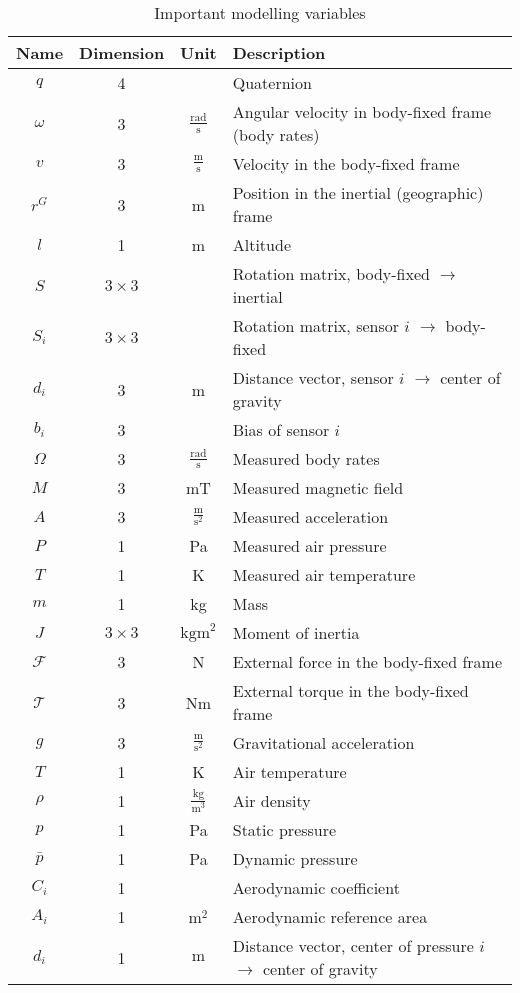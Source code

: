 \begin{table}[ht]
\begin{center}
\begin{tabular}{c c c l}
Name & Dimension & Unit & Description \\
\hline
$q$ & 4 & & Quaternion \\
$\omega$ & 3 & $\frac{\mathrm{rad}}{\mathrm{s}}$& Angular velocity in body-fixed frame (body rates) \\
$v$ & 3 &$\frac{\mathrm{m}}{\mathrm{s}}$ & Velocity in the body-fixed frame\\
$r^G$ & 3 & m & Position in the inertial (geographic) frame \\
$l$ & 1 & m & Altitude \\
\hline
$S$ & $3{\times}3$ & & Rotation matrix, body-fixed $\rightarrow$ inertial \\
$S_i$ & $3{\times}3$ & & Rotation matrix, sensor $i$ $\rightarrow$ body-fixed \\
$d_i$ & 3 & m & Distance vector, sensor $i$ $\rightarrow$ center of gravity \\
$b_i$ & 3 &  & Bias of sensor $i$ \\
\hline
$\Omega$ & 3 & $\frac{\mathrm{rad}}{\mathrm{s}}$ & Measured body rates \\
$M$ & 3 & mT & Measured magnetic field \\
$A$ & 3 & $\frac{\mathrm{m}}{\mathrm{s}^2}$ & Measured acceleration \\
$P$ & 1 & Pa & Measured air pressure \\
$T$ & 1 & K & Measured air temperature \\
\hline 
$m$ & 1 & kg & Mass \\
$J$ & $3{\times}3$ & $\mathrm{kg m}^2$ & Moment of inertia \\
$\mathcal{F}$ & 3 & N & External force in the body-fixed frame \\
$\mathcal{T}$ & 3 & Nm & External torque in the body-fixed frame \\
$ g $ & 3 & $\frac{\mathrm{m}}{\mathrm{s}^2}$ & Gravitational acceleration \\
\hline
$ T $ & 1 & K & Air temperature \\
$ \rho $ & 1 & $\frac{\mathrm{kg}}{\mathrm{m}^3}$ & Air density \\
$ p $ & 1 & Pa & Static pressure \\
$\bar p$ & 1 & Pa & Dynamic pressure \\
\hline
$C_i$ & 1 & & Aerodynamic coefficient \\
$A_i$ & 1 & $\mathrm{m}^2$ & Aerodynamic reference area \\
$d_i$ & 1 & $\mathrm{m}$ & Distance vector, center of pressure $i$ $\rightarrow$ center of gravity \\
\end{tabular}
\end{center}
\caption{Important modelling variables} \label{tab:symbols_modeling}
\end{table}

\newpage